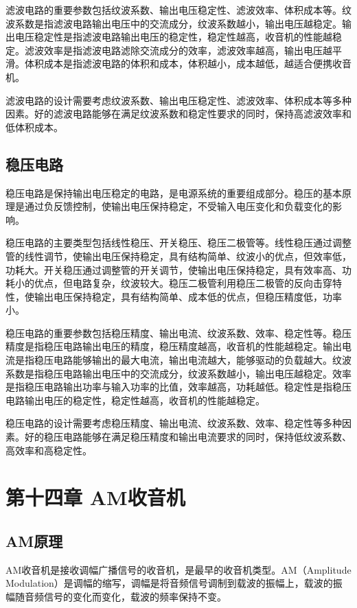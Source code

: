 \documentclass[12pt,UTF8]{ctexbook}
\begin{document}
滤波电路的重要参数包括纹波系数、输出电压稳定性、滤波效率、体积成本等。纹波系数是指滤波电路输出电压中的交流成分，纹波系数越小，输出电压越稳定。输出电压稳定性是指滤波电路输出电压的稳定性，稳定性越高，收音机的性能越稳定。滤波效率是指滤波电路滤除交流成分的效率，滤波效率越高，输出电压越平滑。体积成本是指滤波电路的体积和成本，体积越小，成本越低，越适合便携收音机。

滤波电路的设计需要考虑纹波系数、输出电压稳定性、滤波效率、体积成本等多种因素。好的滤波电路能够在满足纹波系数和稳定性要求的同时，保持高滤波效率和低体积成本。

\section{稳压电路}

稳压电路是保持输出电压稳定的电路，是电源系统的重要组成部分。稳压的基本原理是通过负反馈控制，使输出电压保持稳定，不受输入电压变化和负载变化的影响。

稳压电路的主要类型包括线性稳压、开关稳压、稳压二极管等。线性稳压通过调整管的线性调节，使输出电压保持稳定，具有结构简单、纹波小的优点，但效率低，功耗大。开关稳压通过调整管的开关调节，使输出电压保持稳定，具有效率高、功耗小的优点，但电路复杂，纹波较大。稳压二极管利用稳压二极管的反向击穿特性，使输出电压保持稳定，具有结构简单、成本低的优点，但稳压精度低，功率小。

稳压电路的重要参数包括稳压精度、输出电流、纹波系数、效率、稳定性等。稳压精度是指稳压电路输出电压的精度，稳压精度越高，收音机的性能越稳定。输出电流是指稳压电路能够输出的最大电流，输出电流越大，能够驱动的负载越大。纹波系数是指稳压电路输出电压中的交流成分，纹波系数越小，输出电压越稳定。效率是指稳压电路输出功率与输入功率的比值，效率越高，功耗越低。稳定性是指稳压电路输出电压的稳定性，稳定性越高，收音机的性能越稳定。

稳压电路的设计需要考虑稳压精度、输出电流、纹波系数、效率、稳定性等多种因素。好的稳压电路能够在满足稳压精度和输出电流要求的同时，保持低纹波系数、高效率和高稳定性。

\chapter{第十四章 AM收音机}

\section{AM原理}

AM收音机是接收调幅广播信号的收音机，是最早的收音机类型。AM（Amplitude Modulation）是调幅的缩写，调幅是将音频信号调制到载波的振幅上，载波的振幅随音频信号的变化而变化，载波的频率保持不变。
\end{document}
